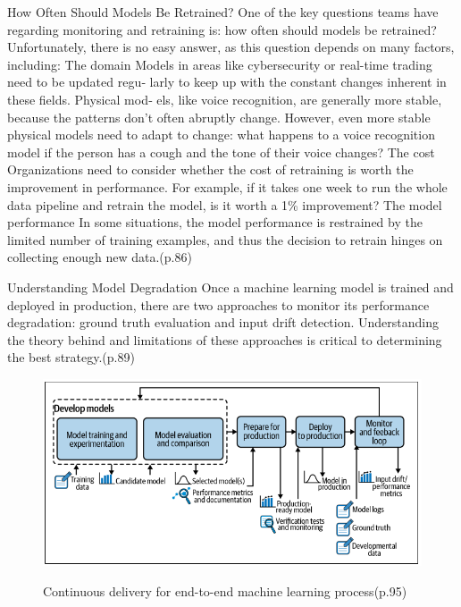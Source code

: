 How Often Should Models Be Retrained?
One of the key questions teams have regarding monitoring and retraining is: how
often should models be retrained? Unfortunately, there is no easy answer, as this
question depends on many factors, including:
The domain
Models in areas like cybersecurity or real-time trading need to be updated regu‐
larly to keep up with the constant changes inherent in these fields. Physical mod‐
els, like voice recognition, are generally more stable, because the patterns don’t
often abruptly change. However, even more stable physical models need to adapt
to change: what happens to a voice recognition model if the person has a cough
and the tone of their voice changes?
The cost
Organizations need to consider whether the cost of retraining is worth the
improvement in performance. For example, if it takes one week to run the whole
data pipeline and retrain the model, is it worth a 1\% improvement?
The model performance
In some situations, the model performance is restrained by the limited number of
training examples, and thus the decision to retrain hinges on collecting enough
new data.\cite{treveil2020introducing}(p.86)

Understanding Model Degradation
Once a machine learning model is trained and deployed in production, there are two
approaches to monitor its performance degradation: ground truth evaluation and
input drift detection. Understanding the theory behind and limitations of these
approaches is critical to determining the best strategy.\cite{treveil2020introducing}(p.89)

\begin{figure}[!htbp]
    \caption{Continuous delivery for end-to-end machine learning process\cite{treveil2020introducing}(p.95)}
    \centering
    \includegraphics[scale=0.5]{images/feedback-loop-intro}
    \label{fig:feedback-loop-intro}
\end{figure}

